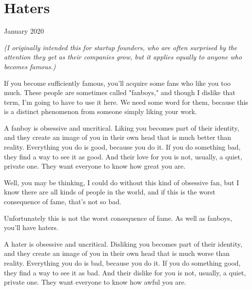 \chapter{Haters}


            
              
                

January 2020

\emph{(I originally intended this for startup founders, who are
                    often surprised by the attention they get as their companies
                    grow, but it applies equally to anyone who becomes
                    famous.)}

If you become sufficiently famous, you'll acquire
                  some fans who like you too much. These people are sometimes
                  called "fanboys," and though I dislike that term, I'm going to
                  have to use it here. We need some word for them, because this
                  is a distinct phenomenon from someone simply liking your
                  work.

A fanboy is obsessive and uncritical. Liking
                  you becomes part of their identity, and they create an image
                  of you in their own head that is much better than reality.
                  Everything you do is good, because you do it. If you do
                  something bad, they find a way to see it as good. And their
                  love for you is not, usually, a quiet, private one. They want
                  everyone to know how great you are.

Well, you may
                  be thinking, I could do without this kind of obsessive fan,
                  but I know there are all kinds of people in the world, and if
                  this is the worst consequence of fame, that's not so bad.

Unfortunately
                  this is not the worst consequence of fame. As well as fanboys,
                  you'll have haters.

A hater is obsessive and
                  uncritical. Disliking you becomes part of their identity, and
                  they create an image of you in their own head that is much
                  worse than reality. Everything you do is bad, because you do
                  it. If you do something good, they find a way to see it as
                  bad. And their dislike for you is not, usually, a quiet,
                  private one. They want everyone to know how awful you are.


